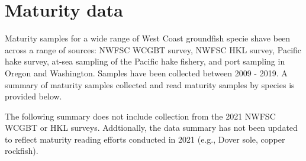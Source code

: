 \documentclass[11pt,
  english,
  letterpaper,
]{article}
\begin{document}

\hypertarget{maturity-data}{%
\section{Maturity data}\label{maturity-data}}

\leavevmode\tagmcend\tagstructend


Maturity samples for a wide range of West Coast groundfish specie shave been across a range of sources: NWFSC WCGBT survey, NWFSC HKL survey, Pacific hake survey, at-sea sampling of the Pacific hake fishery, and port sampling in Oregon and Washington. Samples have been collected between 2009 - 2019. A summary of maturity samples collected and read maturity samples by species is provided below.

\leavevmode\tagmcend\tagstructend\par


The following summary does not include collection from the 2021 NWFSC WCGBT or HKL surveys. Addtionally, the data summary has not been updated to reflect maturity reading efforts conducted in 2021 (e.g., Dover sole, copper rockfish).

\leavevmode\tagmcend\tagstructend\par

\begingroup\fontsize{10}{12}\selectfont
\begingroup\fontsize{10}{12}\selectfont
\end{document}
